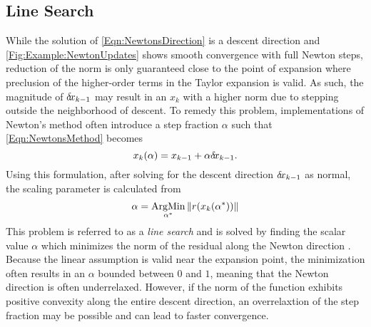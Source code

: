 \documentclass[12pt]{UWMadThesis}
\begin{document}
\subsection{Line Search}
While the solution of \cref{Eqn:NewtonsDirection} is a descent direction and \cref{Fig:Example:NewtonUpdates} shows smooth convergence with full Newton steps, reduction of the norm is only guaranteed close to the point of expansion where preclusion of the higher-order terms in the Taylor expansion is valid.
As such, the magnitude of $\delta \mkern-3.00mu x_{k-1}$ may result in an $x_k$ with a higher norm due to stepping outside the neighborhood of descent.
To remedy this problem, implementations of Newton's method often introduce a step fraction $\alpha$ such that \cref{Eqn:NewtonsMethod} becomes
\begin{equation}
    x_k(\alpha) = x_{k-1} + \alpha \delta \mkern-3.00mu x_{k-1}.
\end{equation}
Using this formulation, after solving for the descent direction $\delta \mkern-3.00mu x_{k-1}$ as normal, the scaling parameter is calculated from
\begin{equation}
    \alpha = \operatorname*{ArgMin}_{\alpha^*}\|r(x_{k}(\alpha^*))\|
    \label{Eqn:ExactLineSearch}
\end{equation}
This problem is referred to as a \textit{line search} and is solved by finding the scalar value $\alpha$ which minimizes the norm of the residual along the Newton direction \cite{kelley_solving_2003}.
Because the linear assumption is valid near the expansion point, the minimization often results in an $\alpha$ bounded between $0$ and $1$, meaning that the Newton direction is often underrelaxed.
However, if the norm of the function exhibits positive convexity along the entire descent direction, an overrelaxtion of the step fraction may be possible and can lead to faster convergence.
\end{document}
